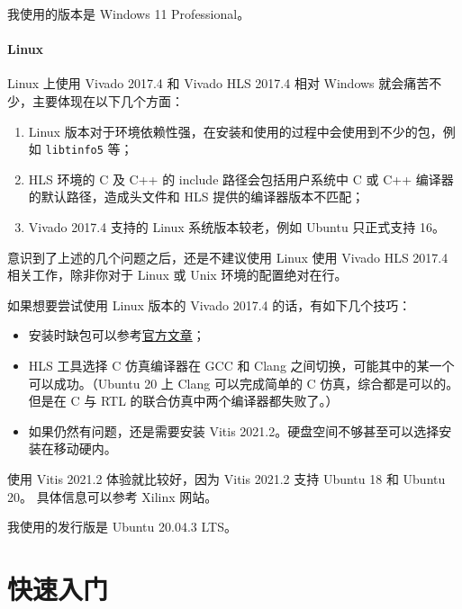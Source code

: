 \documentclass[Chinese,TC,use boldface,simple Names]{beaulivre}
\begin{document}
      \begin{tip}
        我使用的版本是 Windows 11 Professional。
      \end{tip}

    \subsection{Linux}

      Linux 上使用 Vivado 2017.4 和 Vivado HLS 2017.4 相对 Windows 就会痛苦不少，主要体现在以下几个方面：
      \begin{enumerate}
        \item Linux 版本对于环境依赖性强，在安装和使用的过程中会使用到不少的包，例如 \texttt{libtinfo5} 等；
        \item HLS 环境的 C 及 C++ 的 include 路径会包括用户系统中 C 或 C++ 编译器的默认路径，造成头文件和 HLS 提供的编译器版本不匹配；
        \item Vivado 2017.4 支持的 Linux 系统版本较老，例如 Ubuntu 只正式支持 16。
      \end{enumerate}

      \begin{warning}
        意识到了上述的几个问题之后，还是不建议使用 Linux 使用 Vivado HLS 2017.4 相关工作，除非你对于 Linux 或 Unix 环境的配置绝对在行。
      \end{warning}

      如果想要尝试使用 Linux 版本的 Vivado 2017.4 的话，有如下几个技巧：
      \begin{itemize}
        \item 安装时缺包可以参考\href{https://support.xilinx.com/s/article/63794?language=en_US}{官方文章}；
        \item HLS 工具选择 C 仿真编译器在 GCC 和 Clang 之间切换，可能其中的某一个可以成功。（Ubuntu 20 上 Clang 可以完成简单的 C 仿真，综合都是可以的。但是在 C 与 RTL 的联合仿真中两个编译器都失败了。）
        \item 如果仍然有问题，还是需要安装 Vitis 2021.2。硬盘空间不够甚至可以选择安装在移动硬内。
      \end{itemize}

      使用 Vitis 2021.2 体验就比较好，因为 Vitis 2021.2 支持 Ubuntu 18 和 Ubuntu 20。
      具体信息可以参考 Xilinx 网站。

      \begin{tip}
        我使用的发行版是 Ubuntu 20.04.3 LTS。
      \end{tip}

\part{快速入门}
\end{document}
